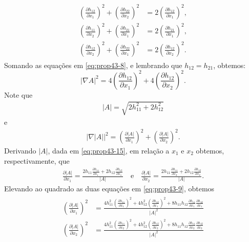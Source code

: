 \begin{demonstracao}
\begin{eqnarray}
\begin{aligned}
\left( \frac{\partial h_{12}}{\partial x_1} \right)^2 + \left( \frac{\partial h_{22}}{\partial x_2} \right)^2 &=  2 \left( \frac{\partial h_{12}}{\partial x_1} \right)^2, \\
\left( \frac{\partial h_{11}}{\partial x_2} \right)^2 + \left( \frac{\partial h_{21}}{\partial x_1} \right)^2  &= 2 \left( \frac{\partial h_{21}}{\partial x_1} \right)^2, \\
\left( \frac{\partial h_{12}}{\partial x_2} \right)^2 + \left( \frac{\partial h_{22}}{\partial x_1} \right)^2 &=  2 \left( \frac{\partial h_{12}}{\partial x_2} \right)^2  .
\end{aligned}
\end{eqnarray}	
Somando as equações em \eqref{eq:prop43-8}, e lembrando que
$h_{12} = h_{21}$, obtemos:
\begin{equation} \label{eq:prop43-13}
| \nabla A |^2 = 4 \left( \frac{\partial h_{12}}{\partial x_1} \right)^2 + 4\left( \frac{\partial h_{12}}{\partial x_2} \right)^2.
\end{equation}	
Note que 
\begin{eqnarray} \label{eq:prop43-15}
|A| = \sqrt{2 h_{11}^2 + 2 h_{12}^2}
\end{eqnarray}
e
\begin{eqnarray} \label{eq:prop43-11}
| \nabla |A| |^2 = \left( \frac{\partial |A|}{\partial x_1} \right)^2 +
\left( \frac{\partial |A|}{\partial x_2} \right)^2.
\end{eqnarray}
Derivando $|A|$, dada em \eqref{eq:prop43-15}, em rela\c c\~ao a 
$x_1$ e $x_2$ obtemos, respectivamente, que
\begin{eqnarray} \label{eq:prop43-9}
\frac{\partial |A|}{\partial x_1} = \frac{2 h_{11} \frac{\partial h_{11}}{\partial x_1} + 2 h_{12} \frac{\partial h_{12}}{\partial x_1}}{|A|}
\quad\mbox{e}\quad
\frac{\partial |A|}{\partial x_2} = \frac{2 h_{11} \frac{\partial h_{11}}{\partial x_2} + 2 h_{12} \frac{\partial h_{12}}{\partial x_2}}{|A|}.
\end{eqnarray}	
Elevando ao quadrado as duas equa\c c\~oes em \eqref{eq:prop43-9},
obtemos
\begin{eqnarray} \label{eq:prop43-10}
\begin{aligned}
\left( \frac{\partial |A|}{\partial x_1} \right)^2 &= \frac{4 h_{11}^2 \left( \frac{\partial h_{11}}{\partial x_1} \right)^2 + 4 h_{12}^2 \left( \frac{\partial h_{12}}{\partial x_1} \right)^2 + 8 h_{11} h_{12} \frac{\partial h_{11}}{\partial x_1} \frac{\partial h_{12}}{\partial x_1}}{|A|^2} \\
\left( \frac{\partial |A|}{\partial x_2} \right)^2 &= \frac{4 h_{11}^2 \left( \frac{\partial h_{11}}{\partial x_2} \right)^2 + 4 h_{12}^2 \left( \frac{\partial h_{12}}{\partial x_2} \right)^2 + 8 h_{11} h_{12} \frac{\partial h_{11}}{\partial x_2} \frac{\partial h_{12}}{\partial x_2}}{|A|^2}

\end{aligned}
\end{eqnarray}
\end{demonstracao}
